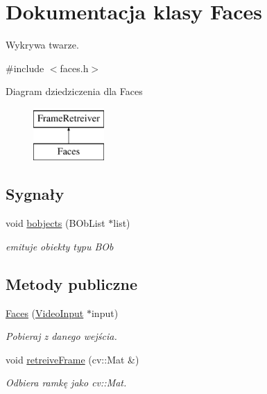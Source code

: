 \hypertarget{class_faces}{
\section{Dokumentacja klasy Faces}
\label{class_faces}
}


Wykrywa twarze.  




{\ttfamily \#include $<$faces.h$>$}

Diagram dziedziczenia dla Faces\begin{figure}[H]
\begin{center}
\leavevmode
\includegraphics[height=2cm]{class_faces}
\end{center}
\end{figure}
\subsection*{Sygnały}
\begin{DoxyCompactItemize}
\item 
\hypertarget{class_faces_a92e42ecfad99d9e0766b569b562b86ba}{
void \hyperlink{class_faces_a92e42ecfad99d9e0766b569b562b86ba}{bobjects} (BObList $\ast$list)}
\label{class_faces_a92e42ecfad99d9e0766b569b562b86ba}

\begin{DoxyCompactList}\small\item\em emituje obiekty typu BOb \item\end{DoxyCompactList}\end{DoxyCompactItemize}
\subsection*{Metody publiczne}
\begin{DoxyCompactItemize}
\item 
\hypertarget{class_faces_a65ba31b6180506d6815f773365883a80}{
\hyperlink{class_faces_a65ba31b6180506d6815f773365883a80}{Faces} (\hyperlink{class_video_input}{VideoInput} $\ast$input)}
\label{class_faces_a65ba31b6180506d6815f773365883a80}

\begin{DoxyCompactList}\small\item\em Pobieraj z danego wejścia. \item\end{DoxyCompactList}\item 
void \hyperlink{class_faces_a7fd92e73e117b72898097551b964fd96}{retreiveFrame} (cv::Mat \&)
\begin{DoxyCompactList}\small\item\em Odbiera ramkę jako cv::Mat. \item\end{DoxyCompactList}\end{DoxyCompactItemize}


